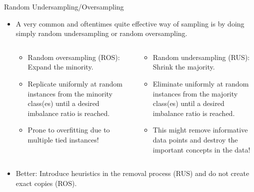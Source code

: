 \documentclass[11pt,compress,t,notes=noshow, xcolor=table]{beamer}
\begin{document}
	\begin{frame}{Random Undersampling/Oversampling}
		\begin{small}
		\begin{itemize}
%			
			\item A very common and oftentimes quite effective way of sampling is by doing simply random undersampling or random oversampling.
			
			\begin{columns}
				\footnotesize
				\begin{column}{0.45\textwidth}
					\begin{itemize}\small
						\item Random oversampling (ROS): Expand the minority.
						\item Replicate uniformly at random instances from the minority class(es) until a desired imbalance ratio is reached.
						\item Prone to overfitting due to multiple tied instances!
					\end{itemize}
				\end{column}
				\begin{column}{0.45\textwidth}
					\begin{itemize}\small
						\item Random undersampling (RUS): Shrink the majority.
						 \item Eliminate uniformly at random instances from the majority class(es) until a desired imbalance ratio is reached.
						 \item This might remove informative data points and destroy the important concepts in the data!
					\end{itemize}
				\end{column}
			\end{columns}
%			
			\item Better: Introduce heuristics in the removal process (RUS) and do not create exact copies (ROS).
%			
			\end{itemize}
		\end{small}	
%
	\end{frame}
	
\end{document}
